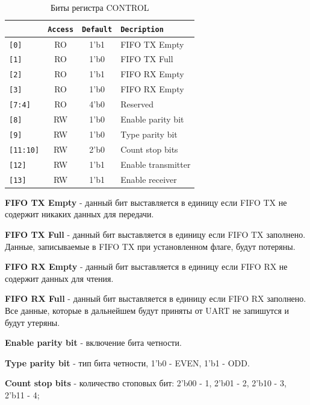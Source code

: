 \documentclass[a4paper,12pt]{article}
\begin{document}
\begin{table}[H]
  \begin{center}
    \begin{tabular}{l|c|c|l}
      \rowcolor[gray]{0.7}{\tt Bit} & {\tt Access} & {\tt Default} & {\tt Decription} \\\hline\hline
      {\tt [0]} & RO & 1'b1 & FIFO TX Empty \\ \hline
      {\tt [1]} & RO & 1'b0 & FIFO TX Full \\ \hline
      {\tt [2]} & RO & 1'b1 & FIFO RX Empty \\ \hline
      {\tt [3]} & RO & 1'b0 & FIFO RX Empty \\ \hline
      {\tt [7:4]} & RO & 4'b0 & Reserved \\ \hline

      {\tt [8]} & RW & 1'b0 & Enable parity bit \\ \hline
      {\tt [9]} & RW & 1'b0 & Type parity bit\\ \hline
      {\tt [11:10]} & RW & 2'b0 & Count stop bits \\ \hline

      {\tt [12]} & RW & 1'b1 & Enable transmitter \\ \hline
      {\tt [13]} & RW & 1'b1 & Enable receiver \\ \hline
    \end{tabular}
    \caption{Биты регистра CONTROL}
    \label{tbl:control_bits}
    \end{center}
\end{table}


\textbf{FIFO TX Empty} - данный бит выставляется в единицу если FIFO TX не содержит никаких данных для передачи.

\textbf{FIFO TX Full} - данный бит выставляется в единицу если FIFO TX заполнено. Данные, записываемые в FIFO TX при установленном флаге, будут потеряны.

\textbf{FIFO RX Empty} - данный бит выставляется в единицу если FIFO RX не содержит данных для чтения.

\textbf{FIFO RX Full} - данный бит выставляется в единицу если FIFO RX заполнено. Все данные, которые в дальнейшем будут приняты от UART не запишутся и будут утеряны.

\textbf{Enable parity bit} - включение бита четности.

\textbf{Type parity bit} - тип бита четности, 1'b0 - EVEN, 1'b1 - ODD.

\textbf{Count stop bits} - количество стоповых бит: 2'b00 - 1, 2'b01 - 2, 2'b10 - 3, 2'b11 - 4;
\end{document}
